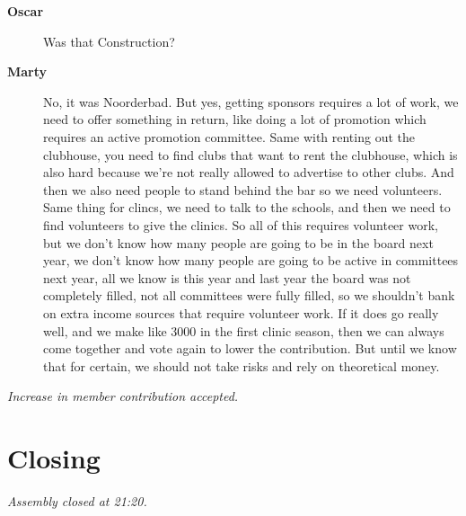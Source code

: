 \documentclass[12pt, a4paper]{article}
\newcommand{\speak}[2]{\begin{description}\item[\textbf{#1}]#2\end{description}}
\begin{document}
\speak{Oscar}{Was that Construction?}

\speak{Marty}{No, it was Noorderbad. But yes, getting sponsors requires a lot of work, we need to offer something in return, like doing a lot of promotion which requires an active promotion committee. Same with renting out the clubhouse, you need to find clubs that want to rent the clubhouse, which is also hard because we're not really allowed to advertise to other clubs. And then we also need people to stand behind the bar so we need volunteers. Same thing for clincs, we need to talk to the schools, and then we need to find volunteers to give the clinics. So all of this requires volunteer work, but we don't know how many people are going to be in the board next year, we don't know how many people are going to be active in committees next year, all we know is this year and last year the board was not completely filled, not all committees were fully filled, so we shouldn't bank on extra income sources that require volunteer work. If it does go really well, and we make like 3000 in the first clinic season, then we can always come together and vote again to lower the contribution. But until we know that for certain, we should not take risks and rely on theoretical money.}

\textit{Increase in member contribution accepted.}

\section{Closing}

\textit{Assembly closed at 21:20.}
\end{document}
